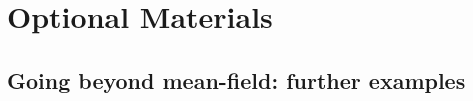 \chapter{Optional Materials} 
\label{chap:optional}





\section{Going beyond mean-field: further examples}


